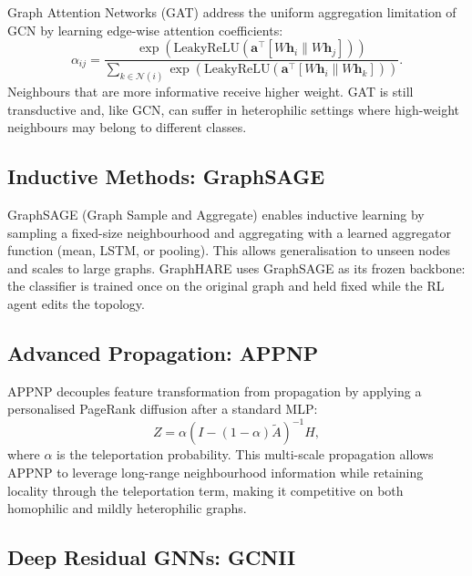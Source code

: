 Graph Attention Networks (GAT) \cite{velickovic2018gat} address the uniform aggregation
limitation of GCN by learning edge-wise attention coefficients:
\begin{equation}
    \alpha_{ij} = \frac{\exp\!\left(\text{LeakyReLU}\left(\mathbf{a}^\top
    [W\mathbf{h}_i \| W\mathbf{h}_j]\right)\right)}
    {\sum_{k \in \mathcal{N}(i)} \exp\!\left(\text{LeakyReLU}\left(\mathbf{a}^\top
    [W\mathbf{h}_i \| W\mathbf{h}_k]\right)\right)}.
\end{equation}
Neighbours that are more informative receive higher weight. GAT is still transductive and,
like GCN, can suffer in heterophilic settings where high-weight neighbours may belong to
different classes.

\subsection{Inductive Methods: GraphSAGE}

GraphSAGE (Graph Sample and Aggregate) \cite{hamilton2017graphsage} enables inductive
learning by sampling a fixed-size neighbourhood and aggregating with a learned aggregator
function (mean, LSTM, or pooling). This allows generalisation to unseen nodes and scales
to large graphs. GraphHARE uses GraphSAGE as its frozen backbone: the classifier is trained
once on the original graph and held fixed while the RL agent edits the topology.

\subsection{Advanced Propagation: APPNP}

APPNP \cite{gasteiger2019appnp} decouples feature transformation from propagation by
applying a personalised PageRank diffusion after a standard MLP:
\begin{equation}
    Z = \alpha \left(I - (1-\alpha)\tilde{A}\right)^{-1} H,
\end{equation}
where $\alpha$ is the teleportation probability. This multi-scale propagation allows APPNP
to leverage long-range neighbourhood information while retaining locality through the
teleportation term, making it competitive on both homophilic and mildly heterophilic graphs.

\subsection{Deep Residual GNNs: GCNII}

